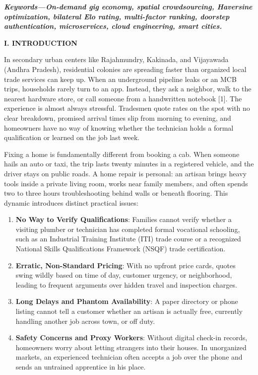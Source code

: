 \documentclass[10pt,twocolumn,a4paper]{article}
\begin{document}
\vspace{0.8em}
\noindent
\textbf{\textit{Keywords---On-demand gig economy, spatial crowdsourcing, Haversine optimization, bilateral Elo rating, multi-factor ranking, doorstep authentication, microservices, cloud engineering, smart cities.}}

\vspace{1.2em}

\noindent
\textbf{\large I. INTRODUCTION}

\vspace{0.5em}
In secondary urban centers like Rajahmundry, Kakinada, and Vijayawada (Andhra Pradesh), residential colonies are spreading faster than organized local trade services can keep up. When an underground pipeline leaks or an MCB trips, households rarely turn to an app. Instead, they ask a neighbor, walk to the nearest hardware store, or call someone from a handwritten notebook [1]. The experience is almost always stressful. Tradesmen quote rates on the spot with no clear breakdown, promised arrival times slip from morning to evening, and homeowners have no way of knowing whether the technician holds a formal qualification or learned on the job last week.

Fixing a home is fundamentally different from booking a cab. When someone hails an auto or taxi, the trip lasts twenty minutes in a registered vehicle, and the driver stays on public roads. A home repair is personal: an artisan brings heavy tools inside a private living room, works near family members, and often spends two to three hours troubleshooting behind walls or beneath flooring. This dynamic introduces distinct practical issues:
\begin{enumerate}
    \item \textbf{No Way to Verify Qualifications}: Families cannot verify whether a visiting plumber or technician has completed formal vocational schooling, such as an Industrial Training Institute (ITI) trade course or a recognized National Skills Qualifications Framework (NSQF) trade certification.
    \item \textbf{Erratic, Non-Standard Pricing}: With no upfront price cards, quotes swing wildly based on time of day, customer urgency, or neighborhood, leading to frequent arguments over hidden travel and inspection charges.
    \item \textbf{Long Delays and Phantom Availability}: A paper directory or phone listing cannot tell a customer whether an artisan is actually free, currently handling another job across town, or off duty.
    \item \textbf{Safety Concerns and Proxy Workers}: Without digital check-in records, homeowners worry about letting strangers into their houses. In unorganized markets, an experienced technician often accepts a job over the phone and sends an untrained apprentice in his place.
\end{enumerate}
\end{document}
